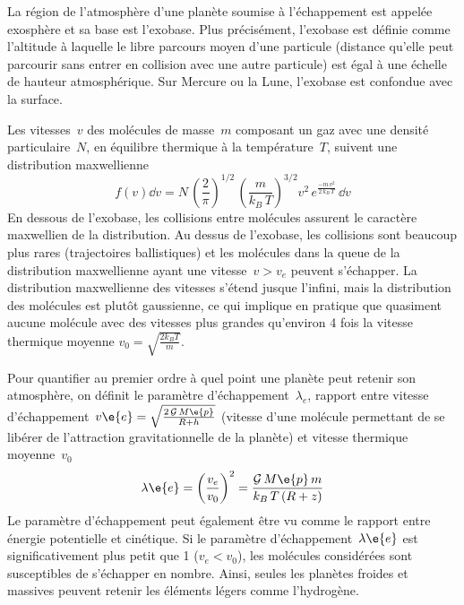 \sk
La région de l'atmosphère d'une planète soumise
à l'échappement est appelée exosphère et sa base
est l'exobase. Plus précisément, l'exobase est
définie comme l'altitude à laquelle le libre
parcours moyen d'une particule (distance qu'elle peut parcourir sans
entrer en collision avec une autre particule)
est égal à une échelle de hauteur atmosphérique.
Sur Mercure ou la Lune, l'exobase est confondue avec la surface.

\sk
Les vitesses~$v$ des molécules de masse~$m$ 
composant un gaz avec une densité particulaire~$N$,
en équilibre thermique à la température~$T$, 
suivent une distribution maxwellienne
\[ f(v) \dd v = N 
\, \left( \frac{2}{\pi} \right)^{1/2}
\, \left( \frac{m}{k_B \, T} \right)^{3/2}
v^2 \, e^{ \frac{-m\,v^2}{2\,k_B\,T}} \, \dd v \]
\noindent En dessous de l'exobase, les collisions entre molécules
assurent le caractère maxwellien de la distribution.
Au dessus de l'exobase, les collisions sont beaucoup
plus rares (trajectoires ballistiques) et les molécules 
dans la queue de la distribution
maxwellienne ayant une vitesse~$v > v_e$ peuvent s'échapper.
La distribution maxwellienne des vitesses s'étend
jusque l'infini, mais la distribution des molécules
est plutôt gaussienne, ce qui implique en pratique
que quasiment aucune molécule avec des vitesses
plus grandes qu'environ 4 fois la vitesse thermique moyenne
$v_0=\sqrt{\frac{2 k_B T}{m}}$.

\sk
Pour quantifier au premier ordre à quel point une planète
peut retenir son atmosphère, on définit le paramètre d'échappement~$\lambda_e$,
rapport entre
vitesse d'échappement~$v\e{e} = \sqrt{\frac{2\,\mathcal{G}\,M\e{p}}{R+h}}$
(vitesse d'une molécule permettant de se libérer 
de l'attraction gravitationnelle de la planète)
et vitesse thermique moyenne~$v_0$
\[ \lambda\e{e} = \left( \frac{v_{e}}{v_0} \right)^2 = \frac{\mathcal{G}\,M\e{p}\,m}{k_B\,T\,(R+z)} \] %
\noindent Le paramètre d'échappement peut également être vu comme
le rapport entre énergie potentielle et cinétique.
Si le paramètre d'échappement~$\lambda\e{e}$ est significativement plus petit que 1 ($v_{e} < v_0$), 
les molécules considérées sont susceptibles de s'échapper en nombre.
Ainsi, seules les planètes froides et massives 
peuvent retenir les éléments légers comme l'hydrogène.

